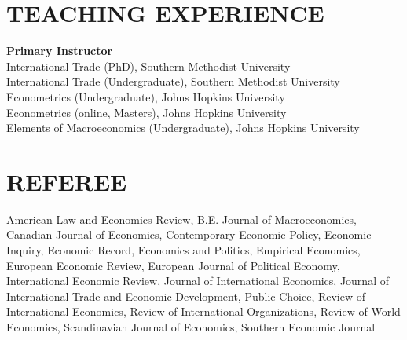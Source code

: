 \documentclass[11pt]{res}
\begin{document}
\begin{resume}
\section{TEACHING EXPERIENCE} \vspace{1.5mm}
{\bf Primary Instructor}\vspace{1.5mm}\\
International Trade (PhD), Southern Methodist University\vspace{1.5mm}\\
International Trade (Undergraduate), Southern Methodist University\vspace{1.5mm}\\
Econometrics (Undergraduate), Johns Hopkins University\vspace{1.5mm}\\
Econometrics (online, Masters), Johns Hopkins University\vspace{1.5mm}\\
Elements of Macroeconomics (Undergraduate), Johns Hopkins University\vspace{1.5mm}\\

\section{REFEREE} \vspace{1.5mm}
American Law and Economics Review, B.E. Journal of Macroeconomics, Canadian Journal of Economics, Contemporary Economic Policy, Economic Inquiry, 
Economic Record, Economics and Politics, Empirical Economics, European Economic Review, European Journal of Political Economy, International Economic Review, Journal of International Economics, Journal of International Trade and Economic Development, Public Choice, Review of International Economics, Review of International Organizations, Review of World Economics, Scandinavian Journal of Economics, Southern Economic Journal
\end{resume}
\end{document}
